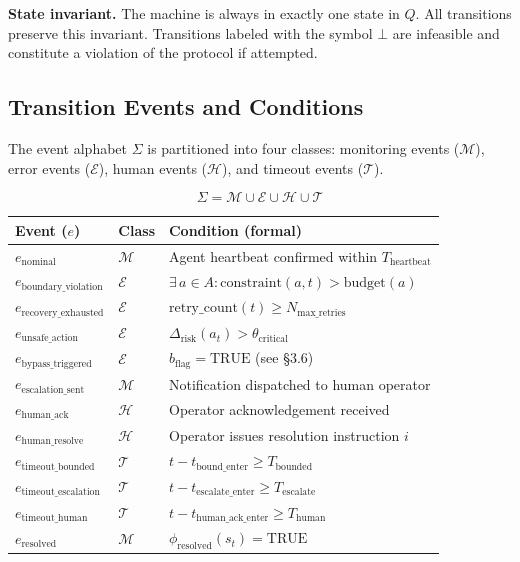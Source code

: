 \bigskip

\noindent\textbf{State invariant.}  The machine is always in exactly one state in
$Q$.  All transitions preserve this invariant.  Transitions labeled with the
symbol $\bot$ are infeasible and constitute a violation of the protocol if
attempted.

\subsection{Transition Events and Conditions}

The event alphabet $\Sigma$ is partitioned into four classes:
monitoring events ($\mathcal{M}$), error events ($\mathcal{E}$), human events
($\mathcal{H}$), and timeout events ($\mathcal{T}$).

\[
\Sigma = \mathcal{M} \cup \mathcal{E} \cup \mathcal{H} \cup \mathcal{T}
\]

\bigskip

\begin{center}
\begin{tabular}{|p{3.2cm}|p{2.8cm}|p{6.5cm}|}
\hline
\textbf{Event ($e$)} & \textbf{Class} & \textbf{Condition (formal)} \\ \hline
$e_\text{nominal}$ & $\mathcal{M}$ & Agent heartbeat confirmed within $T_\text{heartbeat}$ \\ \hline
$e_\text{boundary\_violation}$ & $\mathcal{E}$ & $\exists\, a \in A: \text{constraint}(a, t) > \text{budget}(a)$ \\ \hline
$e_\text{recovery\_exhausted}$ & $\mathcal{E}$ & $\text{retry\_count}(t) \geq N_\text{max\_retries}$ \\ \hline
$e_\text{unsafe\_action}$ & $\mathcal{E}$ & $\Delta_\text{risk}(a_t) > \theta_\text{critical}$ \\ \hline
$e_\text{bypass\_triggered}$ & $\mathcal{E}$ & $b_\text{flag} = \text{TRUE}$ (see \S3.6) \\ \hline
$e_\text{escalation\_sent}$ & $\mathcal{M}$ & Notification dispatched to human operator \\ \hline
$e_\text{human\_ack}$ & $\mathcal{H}$ & Operator acknowledgement received \\ \hline
$e_\text{human\_resolve}$ & $\mathcal{H}$ & Operator issues resolution instruction $i$ \\ \hline
$e_\text{timeout\_bounded}$ & $\mathcal{T}$ & $t - t_\text{bound\_enter} \geq T_\text{bounded}$ \\ \hline
$e_\text{timeout\_escalation}$ & $\mathcal{T}$ & $t - t_\text{escalate\_enter} \geq T_\text{escalate}$ \\ \hline
$e_\text{timeout\_human}$ & $\mathcal{T}$ & $t - t_\text{human\_ack\_enter} \geq T_\text{human}$ \\ \hline
$e_\text{resolved}$ & $\mathcal{M}$ & $\phi_\text{resolved}(s_t) = \text{TRUE}$ \\ \hline
\end{tabular}
\end{center}

